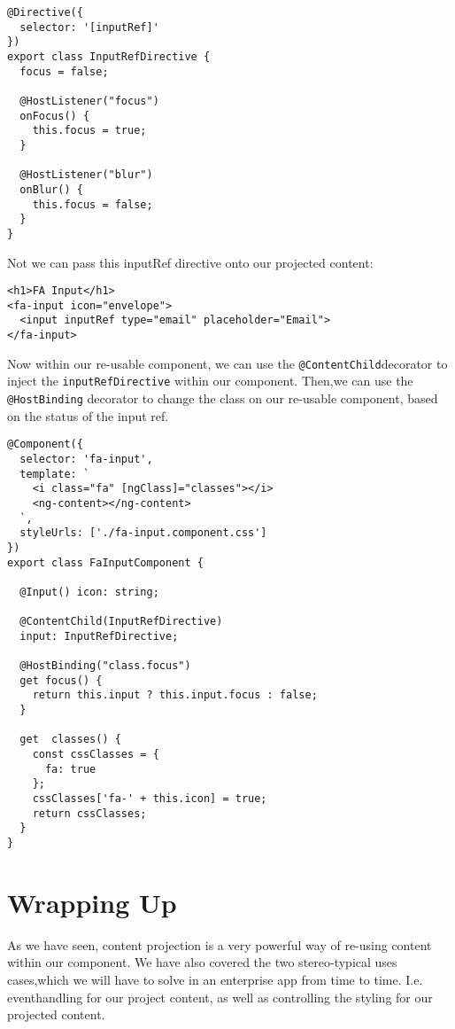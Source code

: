 \begin{lstlisting}
@Directive({
  selector: '[inputRef]'
})
export class InputRefDirective {
  focus = false;

  @HostListener("focus")
  onFocus() {
    this.focus = true;
  }

  @HostListener("blur")
  onBlur() {
    this.focus = false;
  }
}
\end{lstlisting}

Not we can pass this inputRef directive onto our projected content:
\begin{lstlisting}
<h1>FA Input</h1>
<fa-input icon="envelope">
  <input inputRef type="email" placeholder="Email">
</fa-input>
\end{lstlisting}

Now within our re-usable component, we can use the \lstinline{@ContentChild}decorator to inject the \lstinline{inputRefDirective} within our component. Then,we can use the \lstinline{@HostBinding} decorator to change the class on our re-usable component, based on the status of the input ref.
\begin{lstlisting}
@Component({
  selector: 'fa-input',
  template: `
    <i class="fa" [ngClass]="classes"></i>
    <ng-content></ng-content>
  `,
  styleUrls: ['./fa-input.component.css']
})
export class FaInputComponent {

  @Input() icon: string;

  @ContentChild(InputRefDirective)
  input: InputRefDirective;

  @HostBinding("class.focus")
  get focus() {
    return this.input ? this.input.focus : false;
  }

  get  classes() {
    const cssClasses = {
      fa: true
    };
    cssClasses['fa-' + this.icon] = true;
    return cssClasses;
  }
}
\end{lstlisting}

\section{ Wrapping Up }
As we have seen, content projection is a very powerful way of re-using content within our component. We have also covered the two stereo-typical uses cases,which we will have to solve in an enterprise app from time to time. I.e. eventhandling for our project content, as well as controlling the styling for our projected content.